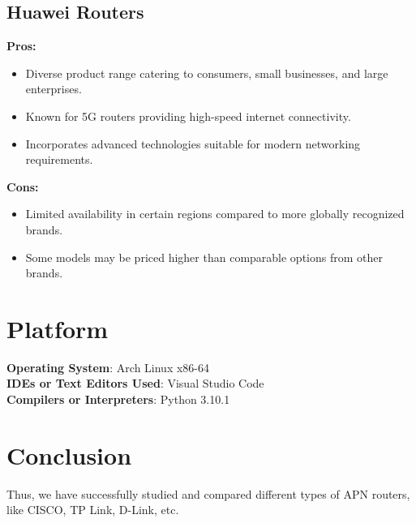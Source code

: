 \documentclass[11pt]{article}
\begin{document}
\subsection{Huawei Routers}
\textbf{Pros:}
\begin{itemize}
  \item Diverse product range catering to consumers, small businesses, and large
        enterprises.
  \item Known for 5G routers providing high-speed internet connectivity.
  \item Incorporates advanced technologies suitable for modern networking requirements.
\end{itemize}
\textbf{Cons:}
\begin{itemize}
  \item Limited availability in certain regions compared to more globally recognized
        brands.
  \item Some models may be priced higher than comparable options from other brands.
\end{itemize}

\section{Platform}
\textbf{Operating System}: Arch Linux x86-64 \\
\textbf{IDEs or Text Editors Used}: Visual Studio Code\\
\textbf{Compilers or Interpreters}: Python 3.10.1\\

\section{Conclusion}
Thus, we have successfully studied and compared different types of APN routers,
like CISCO, TP Link, D-Link, etc.

\clearpage
\end{document}
